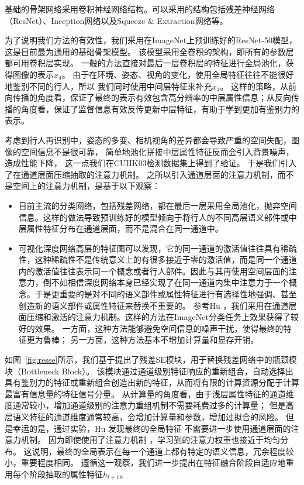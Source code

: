 基础的骨架网络采用卷积神经网络结构。可以采用的结构包括残差神经网络（ResNet）\cite{he2016identity}、Inception网络\cite{szegedy2015going}以及Squeeze \& Extraction网络\cite{hu2017senet}等。

为了说明我们方法的有效性，我们采用在ImageNet上预训练好的ResNet-50模型，这是目前最为通用的基础骨架模型。
该模型采用全卷积的架构，即所有的参数层都可用卷积层实现。
一般的方法直接对最后一层卷积层的特征进行全局池化，获得图像的表示$x_4$。
由于在环境、姿态、视角的变化，使用全局特征往往不能很好地鉴别不同的行人，所以
我们同时使用中间层特征来补充$x_4$。
这样的策略，从前向传播的角度看，保证了最终的表示有效包含高分辨率的中层属性信息；从反向传播的角度看，保证了监督信息有效反传更新中层特征，有助于学到更加有鉴别力的表示。

考虑到行人再识别中，姿态的多变、相机视角的差异都会导致严重的空间失配，图像的空间信息不是很可靠，
简单地池化拼接中层属性特征反而会引入背景噪声，造成性能下降，
这一点我们在CUHK03检测数据集上得到了验证。
于是我们引入了在通道层面压缩抽取的注意力机制。
之所以引入通道层面的注意力机制，而不是空间上的注意力机制，是基于以下观察：
\begin{itemize}
	\item 目前主流的分类网络，包括残差网络，都在最后一层采用全局池化，抛弃空间信息。这样的做法导致预训练好的模型倾向于将行人的不同高层语义部件或中层属性特征分布在通道层面，而不是混合在同一通道中。
	\item 可视化深度网络高层的特征图可以发现，它的同一通道的激活值往往具有稀疏性，这种稀疏性不是传统意义上的有很多接近于零的激活值，而是同一个通道内的激活值往往表示同一个概念或者行人部件。因此与其再使用空间层面的注意力，倒不如相信深度网络本身已经实现了在同一通道内集中注意力于一个概念。于是更重要的是对不同的语义部件或属性特征进行有选择性地强调、甚至创造新的语义部件或属性特征来替换不重要的。
	      参考Hu \etal \cite{hu2017senet}，我们采用在通道层面压缩和激活的注意力机制。这样的方法在ImageNet分类任务上效果获得了较好的效果。
	      一方面，这种方法能够避免空间信息的噪声干扰，使得最终的特征更为鲁棒；
	      另一方面，这种方法基本不增加计算量和显存开销。	
\end{itemize}

如图~\ref{fig:resse}所示，我们基于\cite{hu2017senet}提出了残差SE模块，用于替换残差网络中的瓶颈模块（Bottleneck Block）。
该模块通过通道级别特征响应的重新组合，自动选择出具有鉴别力的特征或重新组合创造出新的特征，从而将有限的计算资源分配于计算最富有信息量的特征信号分量。
从计算量的角度看，由于浅层属性特征的通道维度通常较小，增加通道级别的注意力重组机制不需要耗费过多的计算量；
但是高层语义特征的通道维度通常较高，会增加计算量和参数，增加过拟合的风险。
但是幸运的是，通过实验，Hu \etal 发现最终的全局特征
不需要进一步使用通道层面的注意力机制。
因为即使使用了注意力机制
，学习到的注意力权重也接近于均匀分布。
这说明，最终的全局表示在每一个通道上都有特定的语义信息，冗余程度较小，重要程度相同。
遵循这一观察，我们进一步提出在特征融合阶段自适应地重用每个阶段抽取的属性特征$h_{l+1}$。

